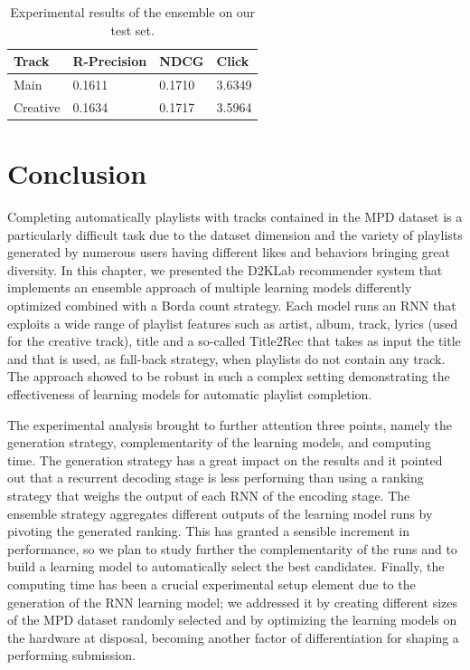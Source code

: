 \begin{table}
\centering
\begin{tabular}{@{}llll@{}}
\toprule
Track    & R-Precision & NDCG   & Click  \\ \midrule
Main     & 0.1611      & 0.1710 & 3.6349 \\
Creative & 0.1634      & 0.1717 & 3.5964 \\ \bottomrule
\end{tabular}
\caption[Results of the ensemble]{Experimental results of the ensemble on our test set.}
\label{rnn:tab:ensemble}
\end{table}

\section{Conclusion}
\label{rnn:sec:conclusion}

Completing automatically playlists with tracks contained in the MPD dataset is a particularly difficult task due to the dataset dimension and the variety of playlists generated by numerous users having different likes and behaviors bringing great diversity. In this chapter, we presented the D2KLab recommender system that implements an ensemble approach of multiple learning models differently optimized combined with a Borda count strategy. Each model runs an RNN that exploits a wide range of playlist features such as artist, album, track, lyrics (used for the creative track), title and a so-called Title2Rec that takes as input the title and that is used, as fall-back strategy, when playlists do not contain any track. The approach showed to be robust in such a complex setting demonstrating the effectiveness of learning models for automatic playlist completion.

The experimental analysis brought to further attention three points, namely the generation strategy, complementarity of the learning models, and computing time. The generation strategy has a great impact on the results and it pointed out that a recurrent decoding stage is less performing than using a ranking strategy that weighs the output of each RNN of the encoding stage. The ensemble strategy aggregates different outputs of the learning model runs by pivoting the generated ranking. This has granted a sensible increment in performance, so we plan to study further the complementarity of the runs and to build a learning model to automatically select the best candidates. Finally, the computing time has been a crucial experimental setup element due to the generation of the RNN learning model; we addressed it by creating different sizes of the MPD dataset randomly selected and by optimizing the learning models on the hardware at disposal, becoming another factor of differentiation for shaping a performing submission.
